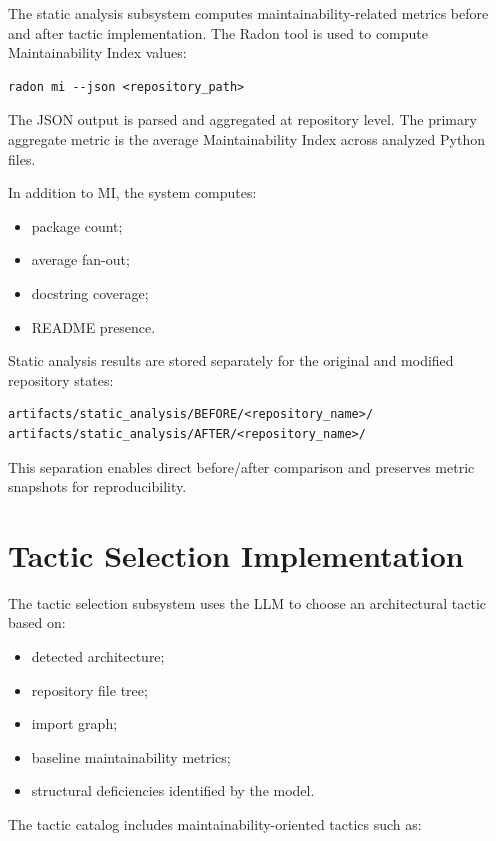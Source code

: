 The static analysis subsystem computes maintainability-related metrics before and after tactic implementation. The Radon tool is used to compute Maintainability Index values:

\begin{verbatim}
radon mi --json <repository_path>
\end{verbatim}

The JSON output is parsed and aggregated at repository level. The primary aggregate metric is the average Maintainability Index across analyzed Python files.

In addition to MI, the system computes:

\begin{itemize}
    \item package count;
    \item average fan-out;
    \item docstring coverage;
    \item README presence.
\end{itemize}

Static analysis results are stored separately for the original and modified repository states:

\begin{verbatim}
artifacts/static_analysis/BEFORE/<repository_name>/
artifacts/static_analysis/AFTER/<repository_name>/
\end{verbatim}

This separation enables direct before/after comparison and preserves metric snapshots for reproducibility.

\section{Tactic Selection Implementation}

The tactic selection subsystem uses the LLM to choose an architectural tactic based on:

\begin{itemize}
    \item detected architecture;
    \item repository file tree;
    \item import graph;
    \item baseline maintainability metrics;
    \item structural deficiencies identified by the model.
\end{itemize}

The tactic catalog includes maintainability-oriented tactics such as:

